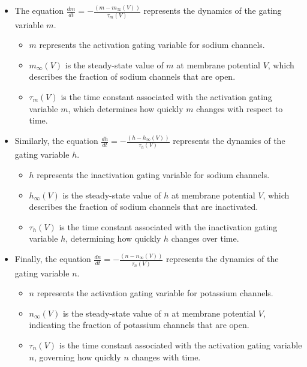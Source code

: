 \documentclass[12pt,a4paper]{report}
\begin{document}
\begin{itemize}
  \item The equation $\frac{dm}{dt} = -\frac{(m - m_{\infty}(V))}{\tau_m(V)}$ represents the dynamics of the gating variable $m$. 
  \begin{itemize}
    \item $m$ represents the activation gating variable for sodium channels.
    \item $m_{\infty}(V)$ is the steady-state value of $m$ at membrane potential $V$, which describes the fraction of sodium channels that are open.
    \item $\tau_m(V)$ is the time constant associated with the activation gating variable $m$, which determines how quickly $m$ changes with respect to time.
  \end{itemize}
  
  \item Similarly, the equation $\frac{dh}{dt} = -\frac{(h - h_{\infty}(V))}{\tau_h(V)}$ represents the dynamics of the gating variable $h$.
  \begin{itemize}
    \item $h$ represents the inactivation gating variable for sodium channels.
    \item $h_{\infty}(V)$ is the steady-state value of $h$ at membrane potential $V$, which describes the fraction of sodium channels that are inactivated.
    \item $\tau_h(V)$ is the time constant associated with the inactivation gating variable $h$, determining how quickly $h$ changes over time.
  \end{itemize}
  
  \item Finally, the equation $\frac{dn}{dt} = -\frac{(n - n_{\infty}(V))}{\tau_n(V)}$ represents the dynamics of the gating variable $n$.
  \begin{itemize}
    \item $n$ represents the activation gating variable for potassium channels.
    \item $n_{\infty}(V)$ is the steady-state value of $n$ at membrane potential $V$, indicating the fraction of potassium channels that are open.
    \item $\tau_n(V)$ is the time constant associated with the activation gating variable $n$, governing how quickly $n$ changes with time.
  \end{itemize}
\end{itemize}
\end{document}
